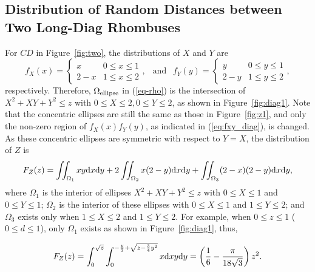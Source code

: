 \documentclass[12pt,draftclsnofoot,onecolumn]{IEEEtran}
\begin{document}
\subsection{Distribution of Random Distances between Two Long-Diag Rhombuses}

For $CD$ in Figure~\ref{fig:two}, the distributions of $X$ and $Y$ are
\begin{equation}\label{eq:fxy_diag}
  f_X(x)=\left\{
    \begin{array}{lr}
      x & 0\leq x \leq 1 \\
      2-x & 1 \leq x \leq 2
    \end{array}
  \right.,
  ~~\mbox{ and }~~ f_Y(y)=\left\{
    \begin{array}{lr}
      y & 0\leq y \leq 1 \\
      2-y & 1 \leq y \leq 2
    \end{array}
  \right.,
\end{equation}
respectively. Therefore, $\Omega_{\rm ellipse}$ in (\ref{eq-rho}) is the 
intersection of $X^2+XY+Y^2 \leq z$ with $0 \leq X \leq 2, 0\leq Y \leq 2$,
as shown in Figure~\ref{fig:diag1}. 
Note that the concentric ellipses are still 
the same as those in Figure~\ref{fig:z1}, and only the non-zero 
region of $f_X(x)f_Y(y)$, as indicated in (\ref{eq:fxy_diag}), 
is changed.  As these concentric 
ellipses are symmetric with respect to $Y=X$, the distribution of $Z$ is
\begin{equation}\label{eq:fz_longdiag}
 F_Z(z)=\iint_{\Omega_1}xy{\rm d}x{\rm d}y+2\iint_{\Omega_2}x(2-y){\rm d}x{\rm
d}y+\iint_{\Omega_3}(2-x)(2-y){\rm d}x{\rm d}y,
\end{equation}
where $\Omega_1$ is the interior of ellipses $X^2+XY+Y^2 \leq z$ with $0 \leq X
\leq 1$ and $0 \leq Y \leq 1$; $\Omega_2$ is the interior of these ellipses with
$0 \leq X \leq 1$ and $1 \leq Y \leq 2$; and $\Omega_3$ exists only when $1 \leq X \leq 2$
and $1 \leq Y \leq 2$.
For example, when $0\leq z \leq 1$ ($0\leq d \leq 1$), only $\Omega_1$
exists as shown in Figure~\ref{fig:diag1}, thus,
\begin{small}
 \begin{equation}
 F_Z(z)=\int_0^{\sqrt{z}}\int_0^{-\frac{y}{2}+\sqrt{z-\frac{3}{4}y^2}}
x{\rm d}xy{\rm d}y=\left(\frac{1}{6}-\frac{\pi}{18\sqrt{3}}\right)z^2.
\end{equation}
\end{small}
\end{document}
